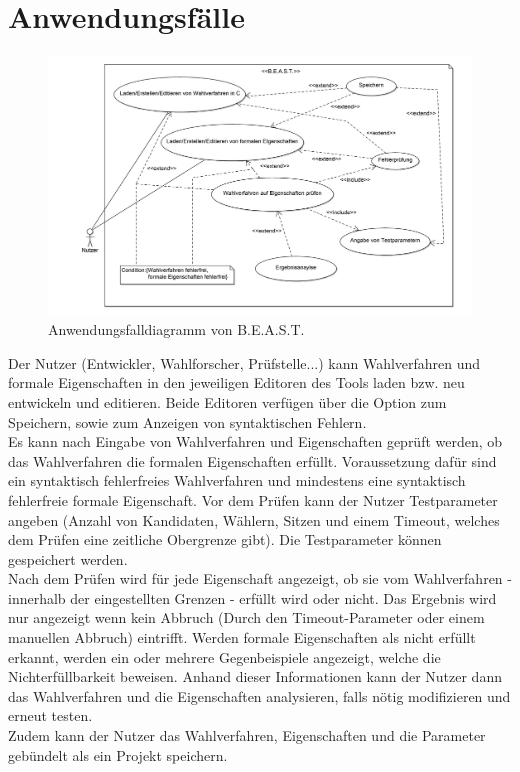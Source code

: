 \documentclass[a4paper]{scrreprt}
\begin{document}
\section{Anwendungsfälle}

\begin{figure}[H]
\hspace{-3cm}
\includegraphics[scale=0.12]{UseCaseDiagram.png}
\caption{Anwendungsfalldiagramm von B.E.A.S.T.}
\label{Packet-scetch}
\end{figure}

Der Nutzer (Entwickler, Wahlforscher, Prüfstelle...) kann Wahlverfahren und formale Eigenschaften in den jeweiligen Editoren des Tools laden bzw. neu entwickeln und editieren.
Beide Editoren verfügen über die Option zum Speichern, sowie zum Anzeigen von syntaktischen Fehlern.\\
Es kann nach Eingabe von Wahlverfahren und Eigenschaften geprüft werden, ob das Wahlverfahren die formalen Eigenschaften erfüllt. Voraussetzung dafür sind ein syntaktisch fehlerfreies Wahlverfahren und mindestens eine syntaktisch fehlerfreie formale Eigenschaft. Vor dem Prüfen kann der Nutzer Testparameter angeben (Anzahl von Kandidaten, Wählern, Sitzen und einem Timeout, welches dem Prüfen eine zeitliche Obergrenze gibt). Die Testparameter können gespeichert werden.\\
Nach dem Prüfen wird für jede Eigenschaft angezeigt, ob sie vom Wahlverfahren - innerhalb der eingestellten Grenzen - erfüllt wird oder nicht. Das Ergebnis wird nur angezeigt wenn kein Abbruch (Durch den Timeout-Parameter oder einem manuellen Abbruch) eintrifft. Werden formale Eigenschaften als nicht erfüllt erkannt, werden ein oder mehrere Gegenbeispiele angezeigt, welche die Nichterfüllbarkeit beweisen. Anhand dieser Informationen kann der Nutzer dann das Wahlverfahren und die Eigenschaften analysieren, falls nötig modifizieren und erneut testen.\\
Zudem kann der Nutzer das Wahlverfahren, Eigenschaften und die Parameter gebündelt als ein Projekt speichern.
\pagebreak
\end{document}
